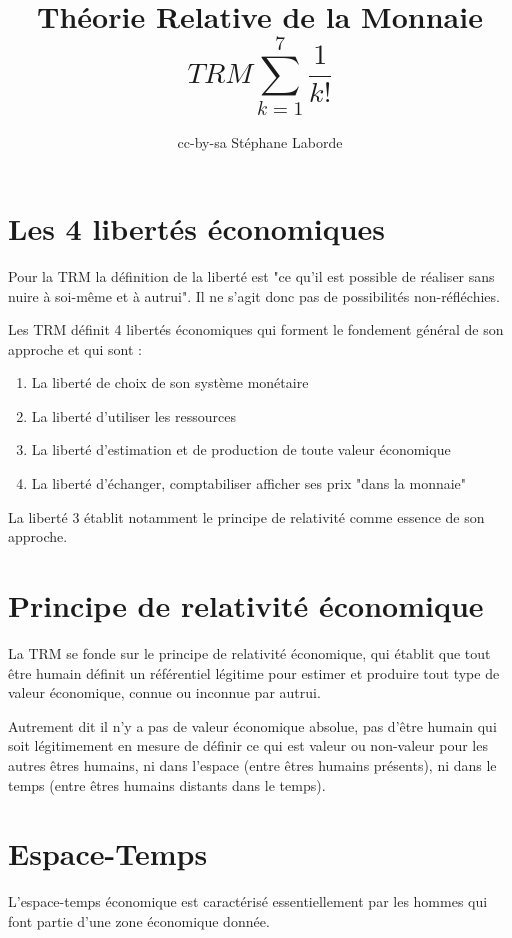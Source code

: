 \documentclass[a4paper,oneside,12pt]{article}
\title{Théorie Relative de la Monnaie \\
\begin{displaymath}TRM \sum_{k=1}^{7}\frac{1}{k!}\end{displaymath}}
\author{cc-by-sa Stéphane Laborde}
\begin{document}
\maketitle
\newpage
\tableofcontents
\newpage

\section{Les 4 libertés économiques}

Pour la TRM la définition de la liberté est "ce qu'il est possible de réaliser sans nuire à soi-même et à autrui". Il ne s'agit donc pas de possibilités non-réfléchies.

Les TRM définit 4 libertés économiques qui forment le fondement général de son approche et qui sont :

\begin{enumerate}
\item La liberté de choix de son système monétaire
\item La liberté d'utiliser les ressources
\item La liberté d'estimation et de production de toute valeur économique
\item La liberté d'échanger, comptabiliser afficher ses prix "dans la monnaie"
\end{enumerate}

La liberté 3 établit notamment le principe de relativité comme essence de son approche.

\section{Principe de relativité économique}
La TRM se fonde sur le principe de relativité économique, qui établit que tout être humain définit un référentiel légitime pour estimer et produire tout type de valeur économique, connue ou inconnue par autrui.

Autrement dit il n'y a pas de valeur économique absolue, pas d'être humain qui soit légitimement en mesure de définir ce qui est valeur ou non-valeur pour les autres êtres humains, ni dans l'espace (entre êtres humains présents), ni dans le temps (entre êtres humains distants dans le temps).

\section{Espace-Temps}
L'espace-temps économique est caractérisé essentiellement par les hommes qui font partie d'une zone économique donnée.
\end{document}
